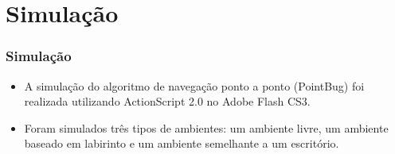 \documentclass[xcolor=dvipsnames, aspectratio=169]{beamer}
\begin{document}
\section{Simulação}
\begin{frame}
  \frametitle{Simulação}
  \begin{itemize}
    \item A simulação do algoritmo de navegação ponto a ponto (PointBug) foi realizada utilizando ActionScript 2.0 no Adobe Flash CS3.
    \item Foram simulados três tipos de ambientes: um ambiente livre, um ambiente baseado em labirinto e um ambiente semelhante a um escritório.
  \end{itemize}


\end{frame}
\end{document}

